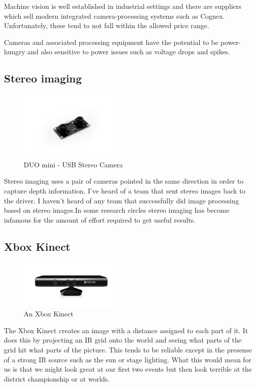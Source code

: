 \documentclass{article}
\begin{document}
Machine vision is well established in industrial settings and there are suppliers which sell modern integrated camera-processing systems such as Cognex.  Unfortunately, these tend to not fall within the allowed price range.  

Cameras and associated processing equipment have the potential to be power-hungry and also sensitive to power issues such as voltage drops and spikes.  

\subsection{Stereo imaging}
\begin{figure}[ht]
\centering
\includegraphics[width=2in]{stereo_camera.jpg}
\caption{DUO mini - USB Stereo Camera}
\end{figure}

Stereo imaging uses a pair of cameras pointed in the same direction in order to capture depth information.  I've heard of a team that sent stereo images back to the driver.  I haven't heard of any team that successfully did image processing based on stereo images.In some research circles stereo imaging has become infamous for the amount of effort required to get useful results.  

\subsection{Xbox Kinect}
\begin{figure}[ht]
\centering
\includegraphics[width=2in]{kinect.jpg}
\caption{An Xbox Kinect}
\end{figure}
The Xbox Kinect creates an image with a distance assigned to each part of it.  It does this by projecting an IR grid onto the world and seeing what parts of the grid hit what parts of the picture.  This tends to be reliable except in the presense of a strong IR source such as the sun or stage lighting.  What this would mean for us is that we might look great at our first two events but then look terrible at the district championship or at worlds.
\end{document}
